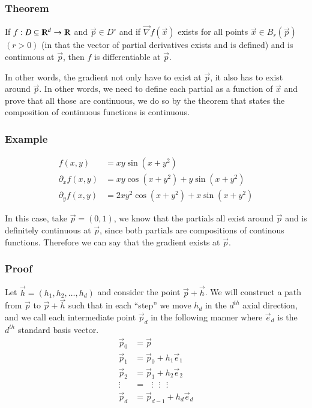 \documentclass [12 pt, twoside] {book}
\newcommand\+{\text{ }}
\begin{document}
\subsubsection{Theorem}
If $f: D \subseteq \varmathbb{R}^d \to \varmathbb{R}$ and $\vec{p} \in D^\circ$
and if $\vec{\nabla}f(\vec{x})$ exists for all points $\vec{x} \in
B_r(\vec{p})$ $(r > 0)$ (in that the vector of partial derivatives exists and is
defined) and is continuous at $\vec{p}$, then $f$ is
differentiable at $\vec{p}$.

In other words, the gradient not only have to exist at $\vec{p}$, it also has to
exist around $\vec{p}$. In other words, we need to define each partial as a
function of $\vec{x}$ and prove that all those are continuous, we do so by the
theorem that states the composition of continuous functions is continuous.

\subsubsection{Example}
\begin{align*}
    f(x, y) &= xy \sin(x + y^2)\\
    \partial_x f(x, y) &= xy \cos(x + y^2) + y \sin(x + y^2)\\
    \partial_y f(x, y) &= 2xy^2\cos(x + y^2) + x\sin(x + y^2)
\end{align*}

In this case, take $\vec{p} = (0, 1)$, we know that the partials all exist
around $\vec{p}$ and is definitely continuous at $\vec{p}$, since both partials
are compositions of continous functions. Therefore we can say that the gradient
exists at $\vec{p}$.

\subsubsection{Proof}
Let $\vec{h} = (h_1, h_2, \dots, h_d)$ and consider the point $\vec{p} +
\vec{h}$. We will construct a path from $\vec{p}$ to $\vec{p} + \vec{h}$ such
that in each ``step'' we move $h_d$ in the $d^{th}$ axial direction, and we call
each intermediate point $\vec{p}_d$ in the following manner where $\vec{e}_d$ is
the $d^{th}$ standard basis vector.
\begin{align*}
    \vec{p}_0 &= \vec{p}\\
    \vec{p}_1 &= \vec{p}_0 + h_1 \vec{e}_1\\
    \vec{p}_2 &= \vec{p}_1 + h_2 \vec{e}_2\\
    \vdots &= \text{     } \vdots \text{     } \vdots \text{     } \vdots\\
    \vec{p}_d &= \vec{p}_{d-1} + h_d \vec{e}_d
\end{align*}
\end{document}
